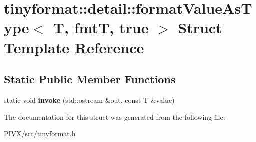 \hypertarget{structtinyformat_1_1detail_1_1format_value_as_type_3_01_t_00_01fmt_t_00_01true_01_4}{}\section{tinyformat\+:\+:detail\+:\+:format\+Value\+As\+Type$<$ T, fmtT, true $>$ Struct Template Reference}
\label{structtinyformat_1_1detail_1_1format_value_as_type_3_01_t_00_01fmt_t_00_01true_01_4}
\subsection*{Static Public Member Functions}
\begin{DoxyCompactItemize}
\item 
\mbox{\label{structtinyformat_1_1detail_1_1format_value_as_type_3_01_t_00_01fmt_t_00_01true_01_4_a7680bc0f7b6b5eee0e27c494812fb667}} 
static void {\bfseries invoke} (std\+::ostream \&out, const T \&value)
\end{DoxyCompactItemize}


The documentation for this struct was generated from the following file\+:\begin{DoxyCompactItemize}
\item 
P\+I\+V\+X/src/tinyformat.\+h\end{DoxyCompactItemize}
